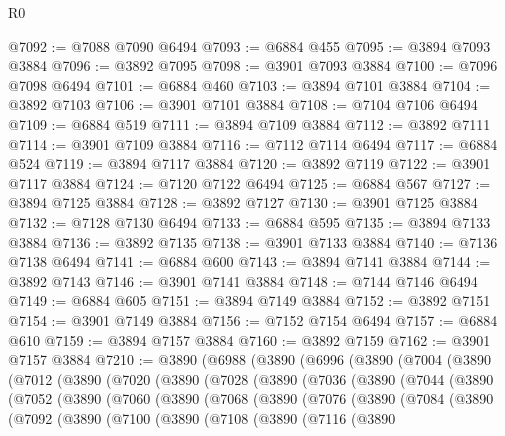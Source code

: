 \begin{lexlean}{R0}
\begin{coremodule}
@7092 := @7088 @7090 @6494
@7093 := @6884 @455
@7095 := @3894 @7093 @3884
@7096 := @3892 @7095
@7098 := @3901 @7093 @3884
@7100 := @7096 @7098 @6494
@7101 := @6884 @460
@7103 := @3894 @7101 @3884
@7104 := @3892 @7103
@7106 := @3901 @7101 @3884
@7108 := @7104 @7106 @6494
@7109 := @6884 @519
@7111 := @3894 @7109 @3884
@7112 := @3892 @7111
@7114 := @3901 @7109 @3884
@7116 := @7112 @7114 @6494
@7117 := @6884 @524
@7119 := @3894 @7117 @3884
@7120 := @3892 @7119
@7122 := @3901 @7117 @3884
@7124 := @7120 @7122 @6494
@7125 := @6884 @567
@7127 := @3894 @7125 @3884
@7128 := @3892 @7127
@7130 := @3901 @7125 @3884
@7132 := @7128 @7130 @6494
@7133 := @6884 @595
@7135 := @3894 @7133 @3884
@7136 := @3892 @7135
@7138 := @3901 @7133 @3884
@7140 := @7136 @7138 @6494
@7141 := @6884 @600
@7143 := @3894 @7141 @3884
@7144 := @3892 @7143
@7146 := @3901 @7141 @3884
@7148 := @7144 @7146 @6494
@7149 := @6884 @605
@7151 := @3894 @7149 @3884
@7152 := @3892 @7151
@7154 := @3901 @7149 @3884
@7156 := @7152 @7154 @6494
@7157 := @6884 @610
@7159 := @3894 @7157 @3884
@7160 := @3892 @7159
@7162 := @3901 @7157 @3884
@7210 := @3890
    (@6988
      (@3890
        (@6996
          (@3890
            (@7004
              (@3890
                (@7012
                  (@3890
                    (@7020
                      (@3890
                        (@7028
                          (@3890
                            (@7036
                              (@3890
                                (@7044
                                  (@3890
                                    (@7052
                                      (@3890
                                        (@7060
                                          (@3890
                                            (@7068
                                              (@3890
                                                (@7076
                                                  (@3890
                                                    (@7084
                                                      (@3890
                                                        (@7092
                                                          (@3890
                                                            (@7100
                                                              (@3890
                                                                (@7108
                                                                  (@3890
                                                                    (@7116
                                                                      (@3890

\end{coremodule}
\end{lexlean}
